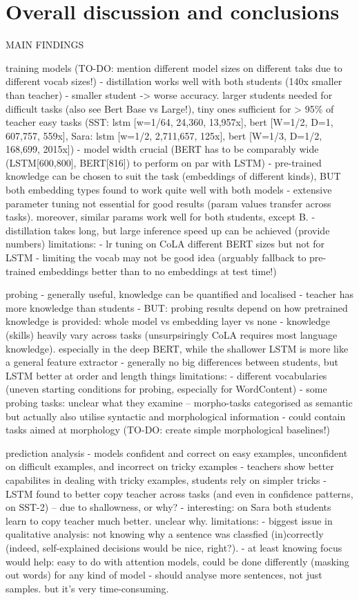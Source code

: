 \documentclass[bsc,frontabs,singlespacing,parskip,deptreport]{infthesis}
\begin{document}
\chapter{Overall discussion and conclusions}{
  MAIN FINDINGS
  
  training models (TO-DO: mention different model sizes on different taks due to different vocab sizes!)
  - distillation works well with both students (140x smaller than teacher)
  - smaller student -> worse accuracy. larger students needed for difficult tasks (also see Bert Base vs Large!), tiny ones sufficient for > 95\% of teacher easy tasks (SST: lstm [w=1/64, 24,360, 13,957x], bert [W=1/2, D=1, 607,757, 559x], Sara: lstm [w=1/2, 2,711,657, 125x], bert [W=1/3, D=1/2, 168,699, 2015x])
  - model width crucial (BERT has to be comparably wide (LSTM[600,800], BERT[816]) to perform on par with LSTM)
  - pre-trained knowledge can be chosen to suit the task (embeddings of different kinds), BUT both embedding types found to work quite well with both models
  - extensive parameter tuning not essential for good results (param values transfer across tasks). moreover, similar params work well for both students, except B.
  - distillation takes long, but large inference speed up can be achieved (provide numbers)
  limitations:
  - lr tuning on CoLA different BERT sizes but not for LSTM
  - limiting the vocab may not be good idea (arguably fallback to pre-trained embeddings better than to no embeddings at test time!)

  probing
  - generally useful, knowledge can be quantified and localised
  - teacher has more knowledge than students
  - BUT: probing results depend on how pretrained knowledge is provided: whole model vs embedding layer vs none
  - knowledge (skills) heavily vary across tasks (unsurpsiringly CoLA requires most language knowledge). especially in the deep BERT, while the shallower LSTM is more like a general feature extractor
  - generally no big differences between students, but LSTM better at order and length things
  limitations:
  - different vocabularies (uneven starting conditions for probing, especially for WordContent)
  - some probing tasks: unclear what they examine -- morpho-tasks categorised as semantic but actually also utilise syntactic and morphological information
  - could contain tasks aimed at morphology (TO-DO: create simple morphological baselines!)

  prediction analysis
  - models confident and correct on easy examples, unconfident on difficult examples, and incorrect on tricky examples
  - teachers show better capabilites in dealing with tricky examples, students rely on simpler tricks
  - LSTM found to better copy teacher across tasks (and even in confidence patterns, on SST-2) -- due to shallowness, or why?
  - interesting: on Sara both students learn to copy teacher much better. unclear why.
  limitations:
  - biggest issue in qualitative analysis: not knowing why a sentence was classfied (in)correctly (indeed, self-explained decisions would be nice, right?). 
  - at least knowing focus would help: easy to do with attention models, could be done differently (masking out words) for any kind of model
  - should analyse more sentences, not just samples. but it's very time-consuming.

}
\end{document}
